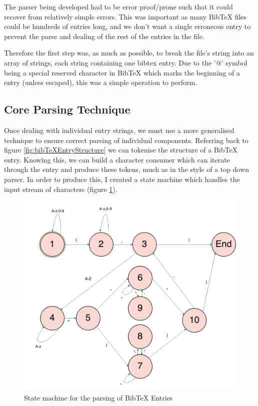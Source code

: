 \documentclass[a4paper,11pt]{article}
\begin{document}
The parser being developed had to be error proof/prone such that it could recover from relatively simple errors. This was important as many BibTeX files could be hundreds of entries long, and we don't want a single erroneous entry to prevent the parse and dealing of the rest of the entries in the file.

Therefore the first step was, as much as possible, to break the file's string into an array of strings, each string containing one bibtex entry. Due to the '@' symbol being a special reserved character in BibTeX which marks the beginning of a entry (unless escaped), this was a simple operation to perform.

\subsection{Core Parsing Technique}
Once dealing with individual entry strings, we must use a more generalised technique to ensure correct parsing of individual components. Referring back to figure \ref{fig:bibTeXEntryStructure} we can tokenise the structure of a BibTeX entry. Knowing this, we can build a character consumer which can iterate through the entry and produce these tokens, much as in the style of a top down parser. In order to produce this, I created a state machine which handles the input stream of characters (figure \ref{fig:stateMachine}).

\begin{figure}[H]
    \centering
    \includegraphics[width=\linewidth]{diagrams/dissStateMachine.drawio.png}
    \caption{State machine for the parsing of BibTeX Entries}
    \label{fig:stateMachine}
\end{figure}
\end{document}
